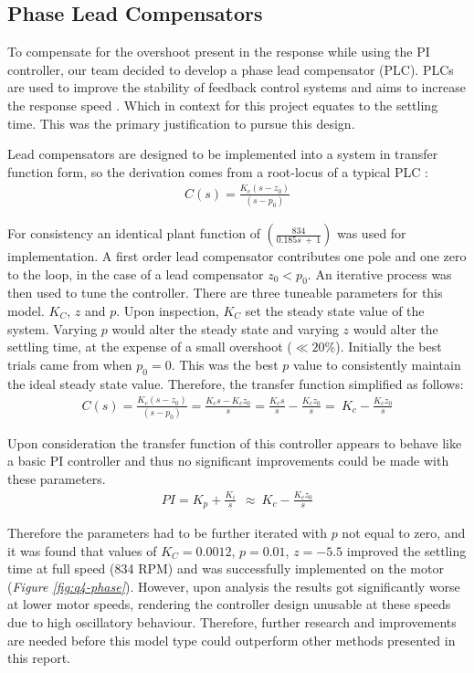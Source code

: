 \documentclass[11pt, onecolumn]{article}
\begin{document}
\subsection*{Phase Lead Compensators}
\par To compensate for the overshoot present in the response while using the PI controller, our team decided to develop a phase lead compensator (PLC). PLCs are used to improve the stability of feedback control systems and aims to increase the response speed \cite{sciencedirectLeadCompensator}. Which in context for this project equates to the settling time. This was the primary justification to pursue this design.
\par Lead compensators are designed to be implemented into a system in transfer function form, so the derivation comes from a root-locus of a typical PLC \cite{umichControlTutorials1}:
\begin{align*}
    C(s)=\frac{K_c(s-z_0)}{(s-p_0)}
\end{align*}
\par For consistency an identical plant function  of $(\frac{834}{0.185s\ +\ 1})$ was used for implementation. A first order lead compensator contributes one pole and one zero to the loop, in the case of a lead compensator $z_0<p_0$. An iterative process was then used to tune the controller. There are three tuneable parameters for this model. $K_C$, $z$ and $p$. Upon inspection, $K_C$ set the steady state value of the system. Varying $p$ would alter the steady state and varying $z$ would alter the settling time, at the expense of a small overshoot ($\ll20$\%). Initially the best trials came from when $p_0=0$. This was the best $p$ value to consistently maintain the ideal steady state value. Therefore, the transfer function simplified as follows:
\begin{align*}
    C\left(s\right)=\frac{K_c\left(s-z_0\right)}{(s-p_0)}=\frac{K_cs-K_cz_0}{s}=\frac{K_cs}{s}-\frac{K_cz_0}{s}=\ K_c-\frac{K_cz_0}{s}
\end{align*}
\par Upon consideration the transfer function of this controller appears to behave like a basic PI controller and thus no significant improvements could be made with these parameters.
\begin{align*}
    PI=K_p+\frac{K_i}{s}\ \ \approx\ K_c-\frac{K_cz_0}{s}
\end{align*}
\par Therefore the parameters had to be further iterated with $p$ not equal to zero, and it was found that values of $K_C = 0.0012$, $p= 0.01$, $z= -5.5$ improved the settling time at full speed (834 RPM) and was successfully implemented on the motor (\textit{Figure \ref{fig:q4-phase}}). However, upon analysis the results got significantly worse at lower motor speeds, rendering the controller design unusable at these speeds due to high oscillatory behaviour. Therefore, further research and improvements are needed before this model type could outperform other methods presented in this report.
\end{document}
